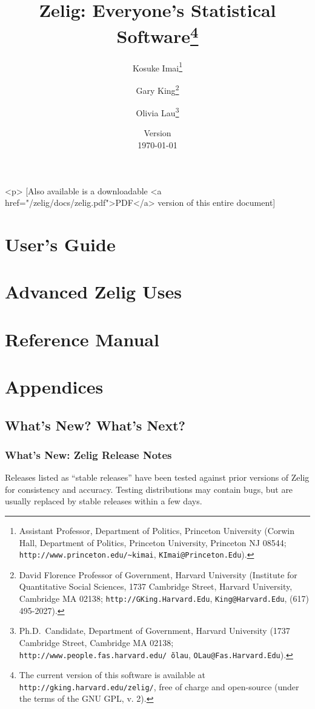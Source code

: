 \documentclass[oneside,letterpaper,12pt]{book}
\title{Zelig: Everyone's Statistical Software\thanks{The current
    version of this software is available at
    \texttt{http://gking.harvard.edu/zelig/}, free of charge and
    open-source (under the terms of the GNU GPL, v. 2).}}
\author{Kosuke
  Imai\thanks{Assistant Professor, Department of Politics, Princeton
    University (Corwin Hall, Department of Politics, Princeton
    University, Princeton NJ 08544; \texttt{http://www.princeton.edu/\~{}kimai},
    \texttt{KImai@Princeton.Edu}).}
\and %
Gary King\thanks{David Florence Professor of Government, Harvard
  University (Institute for Quantitative Social Sciences, 1737 Cambridge 
Street, Harvard University, Cambridge MA 02138;
  \texttt{http://GKing.Harvard.Edu}, \texttt{King@Harvard.Edu}, (617)
  495-2027).}
\and %
Olivia Lau\thanks{Ph.D.\ Candidate, Department of Government, Harvard
  University (1737 Cambridge Street, Cambridge MA 02138;
  \texttt{http://www.people.fas.harvard.edu/\~\,olau},
  \texttt{OLau@Fas.Harvard.Edu}).}}
\date{Version \\ \today}
\begin{document}
\maketitle
\begin{rawhtml}
  <p>
  [Also available is a downloadable <a href="/zelig/docs/zelig.pdf">PDF</a>
  version of this entire document]
\end{rawhtml}

\tableofcontents

\nobibliography*





\part[User's Guide]{User's Guide}






\part{Advanced Zelig Uses}





\part{Reference Manual}



\appendix

\part[Appendices]{Appendices}

%



\chapter{What's New?  What's Next?}

\section{What's New:  Zelig Release Notes}\label{release.notes}

Releases listed as ``stable releases'' have been tested against prior
versions of Zelig for consistency and accuracy.  Testing distributions
may contain bugs, but are usually replaced by stable releases within a
few days. 
\end{document}
